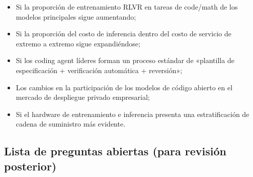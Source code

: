 \begin{itemize}[leftmargin=1.5em]
    \item Si la proporción de entrenamiento RLVR en tareas de code/math de los modelos principales sigue aumentando;
    \item Si la proporción del costo de inferencia dentro del costo de servicio de extremo a extremo sigue expandiéndose;
    \item Si los coding agent líderes forman un proceso estándar de «plantilla de especificación + verificación automática + reversión»;
    \item Los cambios en la participación de los modelos de código abierto en el mercado de despliegue privado empresarial;
    \item Si el hardware de entrenamiento e inferencia presenta una estratificación de cadena de suministro más evidente.
\end{itemize}

\subsection{Lista de preguntas abiertas (para revisión posterior)}

